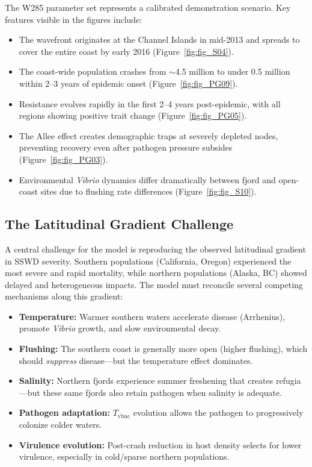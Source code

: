 \documentclass[11pt,letterpaper]{article}
\begin{document}
The W285 parameter set represents a calibrated demonstration scenario. Key features visible in the figures include:

\begin{itemize}
  \item The wavefront originates at the Channel Islands in mid-2013 and spreads to cover the entire coast by early 2016 (Figure~\ref{fig:fig_S04}).
  \item The coast-wide population crashes from $\sim$4.5 million to under 0.5 million within 2--3 years of epidemic onset (Figure~\ref{fig:fig_PG09}).
  \item Resistance evolves rapidly in the first 2--4 years post-epidemic, with all regions showing positive trait change (Figure~\ref{fig:fig_PG05}).
  \item The Allee effect creates demographic traps at severely depleted nodes, preventing recovery even after pathogen pressure subsides (Figure~\ref{fig:fig_PG03}).
  \item Environmental \textit{Vibrio} dynamics differ dramatically between fjord and open-coast sites due to flushing rate differences (Figure~\ref{fig:fig_S10}).
\end{itemize}

\subsection{The Latitudinal Gradient Challenge}

A central challenge for the model is reproducing the observed latitudinal gradient in SSWD severity. Southern populations (California, Oregon) experienced the most severe and rapid mortality, while northern populations (Alaska, BC) showed delayed and heterogeneous impacts. The model must reconcile several competing mechanisms along this gradient:

\begin{itemize}
  \item \textbf{Temperature:} Warmer southern waters accelerate disease (Arrhenius), promote \textit{Vibrio} growth, and slow environmental decay.
  \item \textbf{Flushing:} The southern coast is generally more open (higher flushing), which should \emph{suppress} disease---but the temperature effect dominates.
  \item \textbf{Salinity:} Northern fjords experience summer freshening that creates refugia---but these same fjords also retain pathogen when salinity is adequate.
  \item \textbf{Pathogen adaptation:} $T_{\text{vbnc}}$ evolution allows the pathogen to progressively colonize colder waters.
  \item \textbf{Virulence evolution:} Post-crash reduction in host density selects for lower virulence, especially in cold/sparse northern populations.
\end{itemize}
\end{document}
